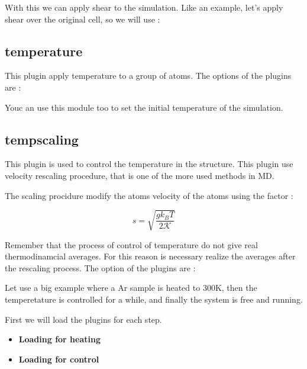 With this we can apply shear to the simulation. Like an example, let's apply
shear over the original cell, so we will use :


\subsection{temperature}
This plugin apply temperature to a group of atoms. The options of the plugins
are :


Youc an use this module too to set the initial temperature of the simulation.


\subsection{tempscaling}
This plugin is used to control the temperature in the structure. This plugin
use velocity rescaling procedure, that is one of the more used methods in MD. 

The scaling procidure modify the atoms velocity of the atoms using the factor :

$$s=\sqrt{\frac{gk_BT}{2\mathcal{K}}}$$

Remember that the process of control of temperature do not give real
thermodinamcial averages. For this reason is necessary realize the averages
after the rescaling process. The option of the plugins are :


Let use a big example where a Ar sample is heated to 300K, then the
temperetature is controlled for a while, and finally the system is free and
running.

First we will load the plugins for each step.

\begin{itemize}
 \item \textbf{Loading for heating}
 \item \textbf{Loading for control}
\end{itemize}

